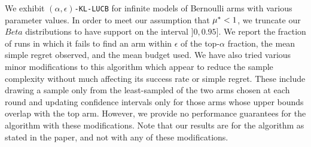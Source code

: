 We exhibit
\texttt{$(\alpha,\epsilon)$-KL-LUCB} for infinite models of Bernoulli arms with
various parameter values.
In order to meet our assumption that $\mu^* < 1$,
we truncate our $Beta$ distributions to have support on the
interval $]0, 0.95]$.
We report the fraction of runs in which it fails to find an arm within $\epsilon$ of the top-$\alpha$
fraction, the mean simple regret observed, and the mean budget used.
We have also tried various minor modifications to this algorithm which appear to 
reduce the sample complexity without much affecting its success rate or simple regret.
These include drawing a sample only from the least-sampled of the two arms
chosen at each round
and updating confidence intervals only for those arms whose upper bounds overlap 
with the top arm.
However, we provide no performance guarantees for the algorithm with these 
modifications.
Note that our results are for the algorithm as stated in the paper, and not with 
any of these modifications.

